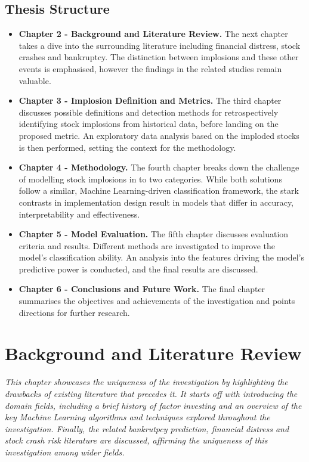 \documentclass[a4paper]{report}
\begin{document}
\section{Thesis Structure}
\begin{itemize}
  \item {\bfseries Chapter 2 - Background and Literature Review.} The next chapter takes a dive into the surrounding literature including financial distress, stock crashes and bankruptcy. The distinction between implosions and these other events is emphasised, however the findings in the related studies 
  remain valuable. 
  \item {\bfseries Chapter 3 - Implosion Definition and Metrics.} The third chapter discusses possible definitions and detection methods for retrospectively identifying stock implosions from historical data, before landing on the proposed metric. An exploratory data analysis 
  based on the imploded stocks is then performed, setting the context for the methodology.
  \item {\bfseries Chapter 4 - Methodology.} The fourth chapter breaks down the challenge of modelling stock implosions in to two categories. While both solutions follow a similar, Machine Learning-driven classification framework, the stark 
  contrasts in implementation design result in models that differ in accuracy, interpretability and effectiveness.
  \item {\bfseries Chapter 5 - Model Evaluation.} The fifth chapter discusses evaluation criteria and results. Different methods are investigated to improve the model's classification ability. An analysis into the features driving the model's predictive power is conducted, and the final 
  results are discussed.
  \item {\bfseries Chapter 6 - Conclusions and Future Work.} The final chapter summarises the objectives and achievements of the investigation and points directions for further research.
\end{itemize}

\chapter{Background and Literature Review}

\textit{This chapter showcases the uniqueness of the investigation by highlighting the drawbacks of existing literature that precedes it. It starts off with introducing the domain fields, including
a brief history of factor investing and an overview of the key Machine Learning algorithms and techniques explored throughout the investigation. Finally, the related bankrutpcy prediction, financial distress 
and stock crash risk literature are discussed, affirming the uniqueness of this investigation among wider fields.}
\end{document}
